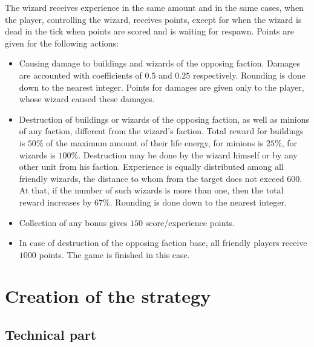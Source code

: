 The wizard receives experience in the same amount and in the same cases, when the player, controlling the wizard, receives points, except for when
the wizard is dead in the tick when points are scored and is waiting for respawn. Points are given for the following actions:
\begin{itemize}
    \item Causing damage to buildings and wizards of the opposing faction. Damages are accounted with coefficients of $0.5$ and $0.25$
        respectively. Rounding is done down to the nearest integer. Points for damages are given only to the player, whose wizard caused
        these damages.
    \item Destruction of buildings or wizards of the opposing faction, as well as minions of any faction, different from the wizard's faction.
        Total reward for buildings is $50\%$ of the maximum amount of their life energy, for minions is $25\%$, for wizards is $100\%$. Destruction
        may be done by the wizard himself or by any other unit from his faction. Experience is equally
        distributed among all friendly wizards, the distance to whom from the target does not exceed $600$. At that, if the number of
        such wizards is more than one, then the total reward increases by $67\%$. Rounding is done down to the nearest
        integer.
    \item Collection of any bonus gives $150$ score/experience points.
    \item In case of destruction of the opposing faction base, all friendly players receive $1000$ points. The game is finished in this case.
\end{itemize}
 
\chapter{Creation of the strategy}
 
\section{Technical part}
 
